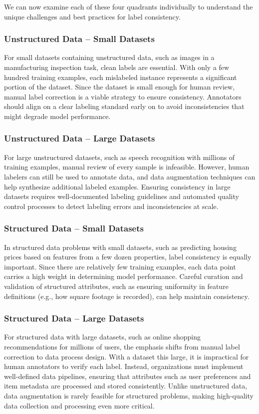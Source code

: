 \documentclass[12pt,openany]{book}
\begin{document}
We can now examine each of these four quadrants individually to understand the unique challenges and best practices for label consistency.

\subsubsection{Unstructured Data – Small Datasets}
For small datasets containing unstructured data, such as images in a manufacturing inspection task, clean labels are essential. With only a few hundred training examples, each mislabeled instance represents a significant portion of the dataset. Since the dataset is small enough for human review, manual label correction is a viable strategy to ensure consistency. Annotators should align on a clear labeling standard early on to avoid inconsistencies that might degrade model performance.

\subsubsection{Unstructured Data – Large Datasets}
For large unstructured datasets, such as speech recognition with millions of training examples, manual review of every sample is infeasible. However, human labelers can still be used to annotate data, and data augmentation techniques can help synthesize additional labeled examples. Ensuring consistency in large datasets requires well-documented labeling guidelines and automated quality control processes to detect labeling errors and inconsistencies at scale.

\subsubsection{Structured Data – Small Datasets}
In structured data problems with small datasets, such as predicting housing prices based on features from a few dozen properties, label consistency is equally important. Since there are relatively few training examples, each data point carries a high weight in determining model performance. Careful curation and validation of structured attributes, such as ensuring uniformity in feature definitions (e.g., how square footage is recorded), can help maintain consistency.

\subsubsection{Structured Data – Large Datasets}
For structured data with large datasets, such as online shopping recommendations for millions of users, the emphasis shifts from manual label correction to data process design. With a dataset this large, it is impractical for human annotators to verify each label. Instead, organizations must implement well-defined data pipelines, ensuring that attributes such as user preferences and item metadata are processed and stored consistently. Unlike unstructured data, data augmentation is rarely feasible for structured problems, making high-quality data collection and processing even more critical. \newline
\end{document}
